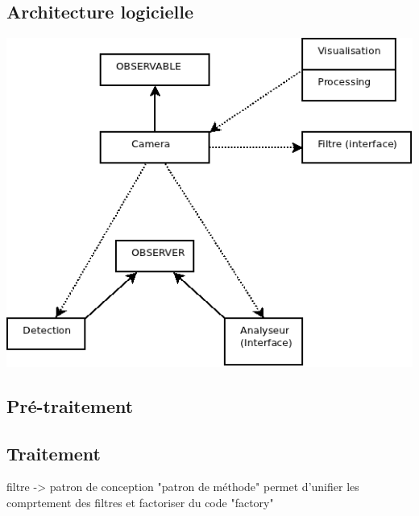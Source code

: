 \subsection{Architecture logicielle}

\begin{center}
\includegraphics[scale=0.66]{Archi/Architecture.png}
\end{center}

\subsection{Pré-traitement} %

\subsection{Traitement}


filtre ->  patron de conception "patron de méthode" permet d'unifier les comprtement des filtres et factoriser du code
			"factory"